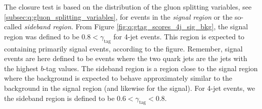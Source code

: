 The closure test is based on the distribution of the gluon splitting variables, see \autoref{subsec:q:gluon_splitting_variables}, for events in the \emph{signal region} or the so-called \emph{sideband region}. From Figure \ref{fig:q:gtag_scores_4j_sig_bkg}, the signal region was defined to be $0.8 < \gamma_\mathrm{tag}$ for 4-jet events. This region is expected to containing primarily signal events, according to the figure.  Remember, signal events are here defined to be events where the two quark jets are the jets with the highest $b$-tag values. The sideband region is a region close to the signal region where the background is expected to behave approximately similar to the background in the signal region (and likewise for the signal). For 4-jet events, we the sideband region is defined to be $0.6 < \gamma_\mathrm{tag} < 0.8$. 

